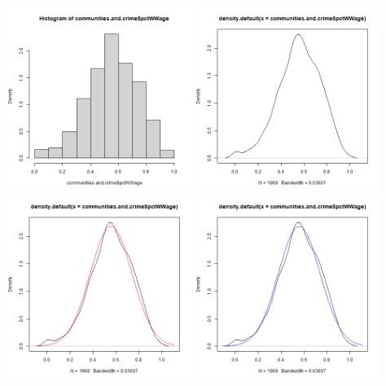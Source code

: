 \documentclass[12pt, letterpaper]{report}
\begin{document}
\centering
\includegraphics[width=0.45\textwidth]{normal/pctWWage_hist}
\includegraphics[width=0.45\textwidth]{normal/pctWWage_density}
\includegraphics[width=0.45\textwidth]{normal/pctWWage_mle}
\includegraphics[width=0.45\textwidth]{normal/pctWWage_mm}
\end{document}
